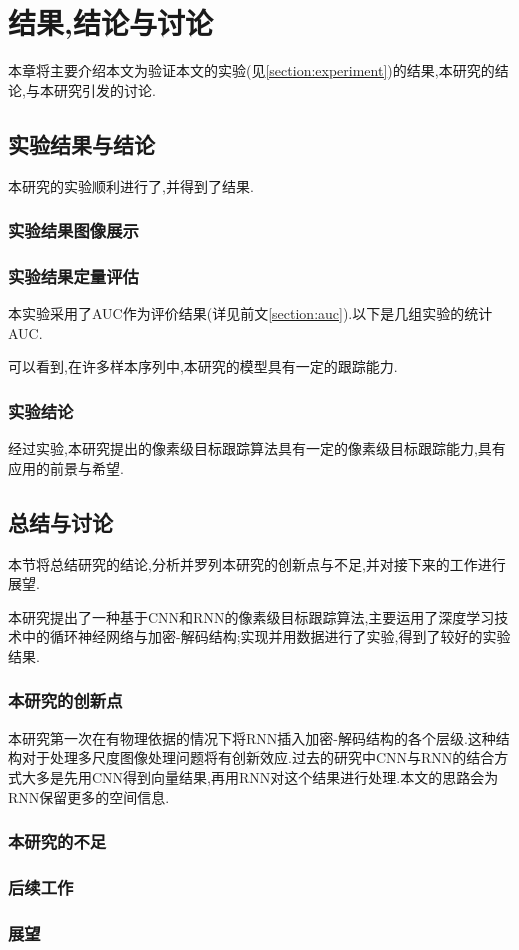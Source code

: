 
\chapter{结果,结论与讨论}
本章将主要介绍本文为验证本文的实验(见\ref{section:experiment})的结果,本研究的结论,与本研究引发的讨论.
\section{实验结果与结论}
本研究的实验顺利进行了,并得到了结果.
\subsection{实验结果图像展示}
\subsection{实验结果定量评估}
本实验采用了AUC作为评价结果(详见前文\ref{section:auc}).以下是几组实验的统计AUC.
\par
可以看到,在许多样本序列中,本研究的模型具有一定的跟踪能力.
\subsection{实验结论}
经过实验,本研究提出的像素级目标跟踪算法具有一定的像素级目标跟踪能力,具有应用的前景与希望.

\section{总结与讨论}
本节将总结研究的结论,分析并罗列本研究的创新点与不足,并对接下来的工作进行展望.
\par
本研究提出了一种基于CNN和RNN的像素级目标跟踪算法,主要运用了深度学习技术中的循环神经网络与加密-解码结构;实现并用数据进行了实验,得到了较好的实验结果.
\subsection{本研究的创新点}
本研究第一次在有物理依据的情况下将RNN插入加密-解码结构的各个层级.这种结构对于处理多尺度图像处理问题将有创新效应.过去的研究中CNN与RNN的结合方式大多是先用CNN得到向量结果,再用RNN对这个结果进行处理.本文的思路会为RNN保留更多的空间信息.
\subsection{本研究的不足}
\subsection{后续工作}
\subsection{展望}

